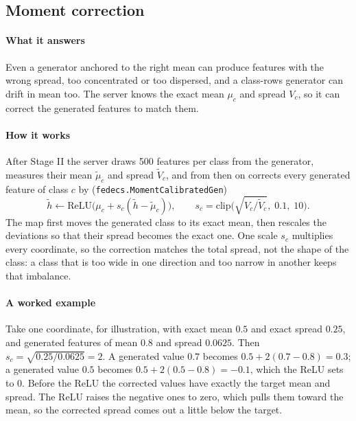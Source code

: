 \subsection{Moment correction}\label{sec:s-mc}

\paragraph{What it answers} Even a generator anchored to the right mean can produce features with the wrong spread,
too concentrated or too dispersed, and a class-rows generator can drift in mean too. The server knows the exact mean
$\mu_c$ and spread $V_c$, so it can correct the generated features to match them.

\paragraph{How it works} After Stage II the server draws 500 features per class from the generator, measures their
mean $\tilde\mu_c$ and spread $\tilde V_c$, and from then on corrects every generated feature of class $c$ by
(\texttt{fedecs.MomentCalibratedGen})
\[
\tilde h\leftarrow\mathrm{ReLU}\big(\mu_c+s_c(\tilde h-\tilde\mu_c)\big),\qquad
s_c=\mathrm{clip}\Big(\sqrt{V_c/\tilde V_c},\;0.1,\;10\Big).
\]
The map first moves the generated class to its exact mean, then rescales the deviations so that their spread becomes
the exact one. One scale $s_c$ multiplies every coordinate, so the correction matches the total spread, not the shape
of the class: a class that is too wide in one direction and too narrow in another keeps that imbalance.

\paragraph{A worked example} Take one coordinate, for illustration, with exact mean $0.5$ and exact spread $0.25$,
and generated features of mean $0.8$ and spread $0.0625$. Then $s_c=\sqrt{0.25/0.0625}=2$. A generated value $0.7$
becomes $0.5+2(0.7-0.8)=0.3$; a generated value $0.5$ becomes $0.5+2(0.5-0.8)=-0.1$, which the ReLU sets to $0$. Before
the ReLU the corrected values have exactly the target mean and spread. The ReLU raises the negative ones to zero, which
pulls them toward the mean, so the corrected spread comes out a little below the target.

